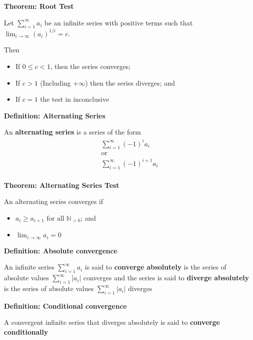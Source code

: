 \documentclass{article}
\newcommand*{\N}{\mathbb{N}}
\begin{document}
\vspace{\baselineskip}
\textbf{Theorem: Root Test}

Let \(\sum^{\infty}_{i=1}a_i\) be an infinite series with positive terms such that \(\lim_{i\to\infty}(a_i)^{1/i}=c\).

Then
\begin{itemize}
    \item If \(0 \leq c < 1\), then the series converges;
    \item If \(c > 1\) (Including +\(\infty\)) then the series diverges; and
    \item If \(c = 1\) the test in inconclusive
\end{itemize}

\vspace{\baselineskip}
\textbf{Definition: Alternating Series}

An \textbf{alternating series} is a series of the form
\begin{equation}
    \begin{split}
        &\sum^{\infty}_{i=1}(-1)^ia_i\\
        &\text{or}\\
        &\sum^{\infty}_{i=1}(-1)^{i+1}a_i\\
    \end{split}
\end{equation}

\textbf{Theorem: Alternating Series Test}

An alternating series converges if
\begin{itemize}
    \item \(a_i \geq a_{i+1}\text{ for all }\N_{>0}\); and
    \item \(\lim_{i\to\infty}a_i = 0\)
\end{itemize}

\vspace{\baselineskip}
\textbf{Definition: Absolute convergence}

An infinite series \(\sum^{\infty}_{i=1}a_i\) is said to \textbf{converge absolutely} is the series of absolute values \(\sum^{\infty}_{i=1}|a_i|\) converges and the series is said to \textbf{diverge absolutely} is the series of absolute values \(\sum^{\infty}_{i=1}|a_i|\) diverges

\vspace{\baselineskip}
\textbf{Definition: Conditional convergence}

A convergent infinite series that diverges absolutely is said to \textbf{converge conditionally}
\end{document}
